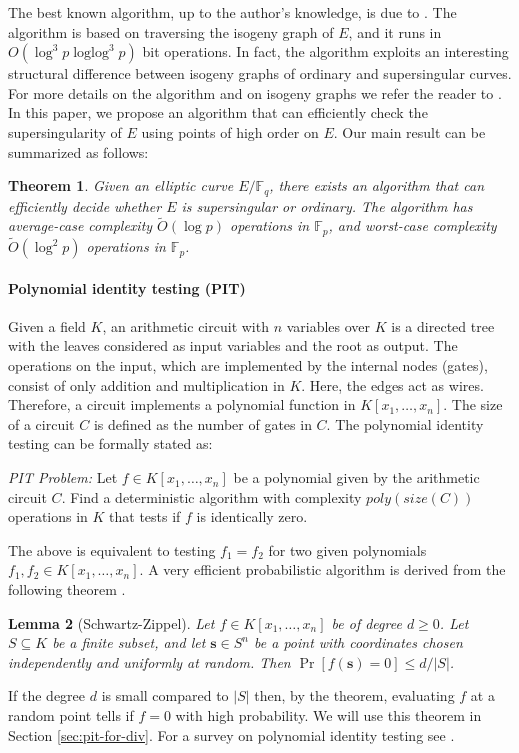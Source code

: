 \documentclass[12pt]{article}
\theoremstyle{plain}
\newtheorem{theorem}{Theorem}
\newtheorem{lemma}[theorem]{Lemma}
\theoremstyle{definition}
\newcommand{\abs}[1]{\left\vert#1\right\vert}
\newcommand{\tildO}{\tilde{O}}
\DeclareMathOperator{\loglog}{loglog}
\def\F{\ensuremath{\mathbb{F}}}
\begin{document}
The best known algorithm, up to the author's knowledge, is due to \cite{sutherland2012}. The 
algorithm is based on traversing the isogeny graph of $E$, and it runs in $O(\log^3p \loglog^3p)$ 
bit operations. In fact, the algorithm exploits an interesting structural difference between 
isogeny graphs of ordinary and supersingular curves. For more details on the algorithm and on 
isogeny graphs we refer the reader to \cite{sutherland2012, kohel1996}. In this paper, we propose 
an algorithm that can efficiently check the supersingularity of $E$ using points of high order on 
$E$. Our main result can be summarized as follows:
\begin{theorem}
	\label{theo:main}
	Given an elliptic curve $E/\F_q$, there exists an algorithm that can efficiently decide whether 
	$E$ is supersingular or ordinary. The algorithm has average-case complexity $\tildO(\log p)$ 
	operations in $\F_p$, and worst-case complexity $\tildO(\log^2 p)$ operations in $\F_p$.
\end{theorem}

\paragraph{Polynomial identity testing (PIT)}
Given a field $K$, an arithmetic circuit with $n$ variables over $K$ is a directed tree with the 
leaves considered as input variables and the root as output. The operations on the input, which are 
implemented by the internal nodes (gates), consist of only addition and multiplication in $K$. 
Here, the edges act as wires. Therefore, a circuit implements a polynomial function in $K[x_1, 
\dots, x_n]$. The size of a circuit $C$ is defined as the number of gates in $C$. The polynomial 
identity testing can be formally stated as: 

\vspace*{2mm}

\textit{PIT Problem:} Let $f \in K[x_1, \dots, x_n]$ be a polynomial given by the arithmetic 
circuit $C$. Find a deterministic algorithm with complexity $poly(size(C))$ operations in $K$ that 
tests if $f$ is identically zero.

\vspace*{2mm}

The above is equivalent to testing $f_1 = f_2$ for two given polynomials $f_1, f_2 \in K[x_1, 
\dots, x_n]$. A very efficient probabilistic algorithm is derived from the following theorem 
\cite{schwartz1980,zippel1979}.
\begin{lemma}[Schwartz-Zippel]
	\label{lemma:Schwartz-Zippel}
	Let $f \in K[x_1, \dots, x_n]$ be of degree $d \ge 0$. Let $S \subseteq K$ be a finite subset, 
	and let $\mathbf{s} \in S^n$ be a point with coordinates chosen independently and uniformly at 
	random. Then $\Pr[f(\mathbf{s}) = 0] \le d / \abs{S}$.
\end{lemma}
If the degree $d$ is small compared to $\abs{S}$ then, by the theorem, evaluating $f$ at a random 
point tells if $f = 0$ with high probability. We will use this theorem in Section 
\ref{sec:pit-for-div}. For a survey on polynomial identity testing see \cite{saxena2009}.
\end{document}
